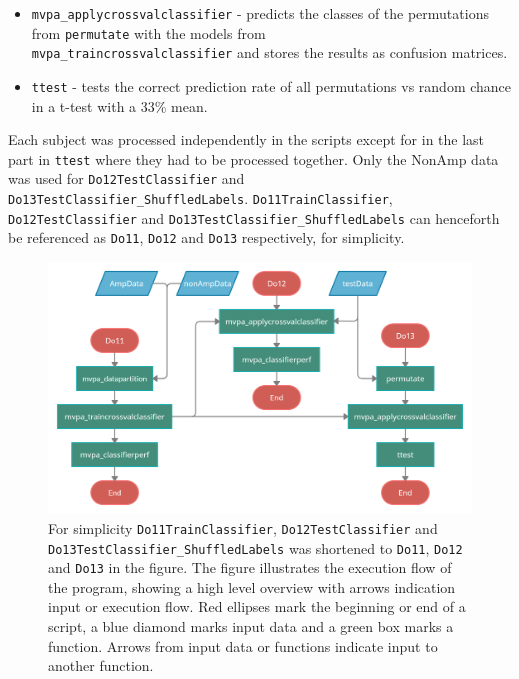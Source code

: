\documentclass[12pt, a4paper]{article}
\begin{document}
\begin{itemize}
\begin{itemize}
        \item \texttt{mvpa\_applycrossvalclassifier} - predicts the classes of the permutations from \texttt{permutate} with the models from \\\texttt{mvpa\_traincrossvalclassifier} and stores the results as confusion matrices.
        
        \item \texttt{ttest} - tests the correct prediction rate of all permutations vs random chance in a t-test with a 33\% mean.
    \end{itemize}
\end{itemize}

Each subject was processed independently in the scripts except for in the last part in \texttt{ttest} where they had to be processed together.
Only the NonAmp data was used for \texttt{Do12TestClassifier} and \\\texttt{Do13TestClassifier\_ShuffledLabels}.
\texttt{Do11TrainClassifier}, \\\texttt{Do12TestClassifier} and \texttt{Do13TestClassifier\_ShuffledLabels} can henceforth be referenced as \texttt{Do11}, \texttt{Do12} and \texttt{Do13} respectively, for simplicity. 

\begin{figure}[H]
    \centering
    \includegraphics[width=1.0\textwidth, ]{pictures/General structure Master Thesis.png}
    \caption{For simplicity \texttt{Do11TrainClassifier}, \texttt{Do12TestClassifier} and \texttt{Do13TestClassifier\_ShuffledLabels} was shortened to \texttt{Do11}, \texttt{Do12} and \texttt{Do13} in the figure.
    The figure illustrates the execution flow of the program, showing a high level overview with arrows indication input or execution flow.
    Red ellipses mark the beginning or end of a script, a blue diamond marks input data and a green box marks a function.
    Arrows from input data or functions indicate input to another function.}
    \label{fig:GeneralProgramStructure}
\end{figure}
\end{document}
